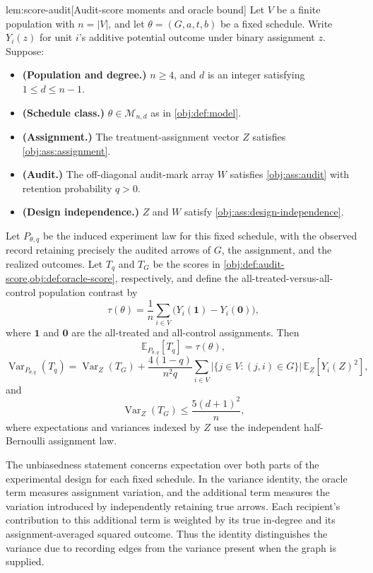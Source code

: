 \begin{lemmav}{lem:score-audit}[Audit-score moments and oracle bound]
Let \(V\) be a finite population with \(n=|V|\), and let \(\theta=(G,a,t,b)\) be a fixed schedule. Write \(Y_i(z)\) for unit \(i\)'s additive potential outcome under binary assignment \(z\). Suppose:
\begin{itemize}
\item \textbf{(Population and degree.)} \(n\ge4\), and \(d\) is an integer satisfying \(1\le d\le n-1\).
\item \textbf{(Schedule class.)} \(\theta\in\mathcal M_{n,d}\) as in \cref{obj:def:model}.
\item \textbf{(Assignment.)} The treatment-assignment vector \(Z\) satisfies \cref{obj:ass:assignment}.
\item \textbf{(Audit.)} The off-diagonal audit-mark array \(W\) satisfies \cref{obj:ass:audit} with retention probability \(q>0\).
\item \textbf{(Design independence.)} \(Z\) and \(W\) satisfy \cref{obj:ass:design-independence}.
\end{itemize}
Let \(P_{\theta,q}\) be the induced experiment law for this fixed schedule, with the observed record retaining precisely the audited arrows of \(G\), the assignment, and the realized outcomes. Let \(T_q\) and \(T_G\) be the scores in \cref{obj:def:audit-score,obj:def:oracle-score}, respectively, and define the all-treated-versus-all-control population contrast by
\[
\tau(\theta)
=\frac1n\sum_{i\in V}
\bigl(Y_i(\mathbf1)-Y_i(\mathbf0)\bigr),
\]
where \(\mathbf1\) and \(\mathbf0\) are the all-treated and all-control assignments. Then
\[
\mathbb E_{P_{\theta,q}}[T_q]=\tau(\theta),
\]
\[
\operatorname{Var}_{P_{\theta,q}}(T_q)
=
\operatorname{Var}_{Z}(T_G)
+\frac{4(1-q)}{n^2q}
\sum_{i\in V}
\bigl|\{j\in V:(j,i)\in G\}\bigr|
\,\mathbb E_Z\!\left[Y_i(Z)^2\right],
\]
and
\[
\operatorname{Var}_{Z}(T_G)\le\frac{5(d+1)^2}{n},
\]
where expectations and variances indexed by \(Z\) use the independent half-Bernoulli assignment law.
\end{lemmav}

The unbiasedness statement concerns expectation over both parts of the experimental design for each fixed schedule. In the variance identity, the oracle term measures assignment variation, and the additional term measures the variation introduced by independently retaining true arrows. Each recipient's contribution to this additional term is weighted by its true in-degree and its assignment-averaged squared outcome. Thus the identity distinguishes the variance due to recording edges from the variance present when the graph is supplied.

